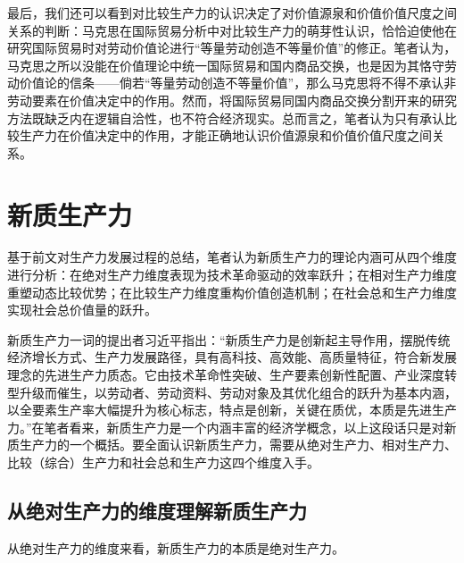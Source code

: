 最后，我们还可以看到对比较生产力的认识决定了对价值源泉和价值价值尺度之间关系的判断：马克思在国际贸易分析中对比较生产力的萌芽性认识，恰恰迫使他在研究国际贸易时对劳动价值论进行“等量劳动创造不等量价值”的修正。笔者认为，马克思之所以没能在价值理论中统一国际贸易和国内商品交换，也是因为其恪守劳动价值论的信条——倘若“等量劳动创造不等量价值”，那么马克思将不得不承认非劳动要素在价值决定中的作用。然而，将国际贸易同国内商品交换分割开来的研究方法既缺乏内在逻辑自洽性，也不符合经济现实。总而言之，笔者认为只有承认比较生产力在价值决定中的作用，才能正确地认识价值源泉和价值价值尺度之间关系。

\section{新质生产力}

基于前文对生产力发展过程的总结，笔者认为新质生产力的理论内涵可从四个维度进行分析：在绝对生产力维度表现为技术革命驱动的效率跃升；在相对生产力维度重塑动态比较优势；在比较生产力维度重构价值创造机制；在社会总和生产力维度实现社会总价值量的跃升。

新质生产力一词的提出者习近平指出：“新质生产力是创新起主导作用，摆脱传统经济增长方式、生产力发展路径，具有高科技、高效能、高质量特征，符合新发展理念的先进生产力质态。它由技术革命性突破、生产要素创新性配置、产业深度转型升级而催生，以劳动者、劳动资料、劳动对象及其优化组合的跃升为基本内涵，以全要素生产率大幅提升为核心标志，特点是创新，关键在质优，本质是先进生产力。”\cite[515-516]{XiJinPingXiJinPingJingJiWenXuanDiYiJuan2025}在笔者看来，新质生产力是一个内涵丰富的经济学概念，以上这段话只是对新质生产力的一个概括。要全面认识新质生产力，需要从绝对生产力、相对生产力、比较（综合）生产力和社会总和生产力这四个维度入手。

\subsection{从绝对生产力的维度理解新质生产力}

从绝对生产力的维度来看，新质生产力的本质是绝对生产力。


